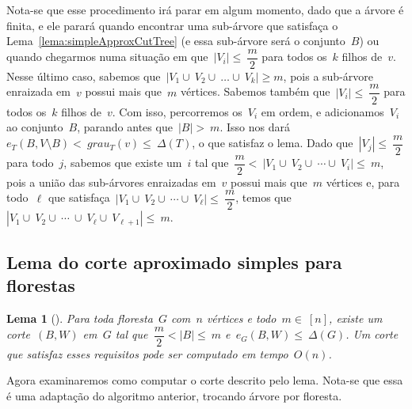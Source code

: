 \documentclass[a4paper,12pt]{article}
\newtheorem{lem}{Lema}
\begin{document}
	Nota-se que esse procedimento irá parar em algum momento, dado 
	que a árvore é finita, e ele parará quando encontrar uma 
	sub-árvore que satisfaça o Lema~\ref{lema:simpleApproxCutTree}
	(e essa sub-árvore será o conjunto~$B$) 
	ou quando chegarmos numa situação em 
	que~$|V_i|\le~\dfrac{m}{2}$ para todos os~$k$ filhos de~$v$.
	Nesse último caso, sabemos 
	que~$|V_1\cup~V_2\cup~\ldots \cup~V_k|\ge m$, pois
	a sub-árvore enraizada em~$v$ possui mais que~$m$ vértices. 
	Sabemos também que~$|V_i|\le~\dfrac{m}{2}$ para todos os~$k$ 
	filhos de~$v$. 
	Com isso, percorremos os~$V_i$ em ordem, e 
	adicionamos~$V_i$ ao conjunto~$B$, parando antes 
	que~$|B| >~m$. 
	Isso nos dará~$e_T(B,V\setminus B) <~grau_T(v)\le~\Delta(T)$, 
	o que satisfaz o lema.
	Dado que~$|V_j|\le~\dfrac{m}{2}$ para todo~$j$, sabemos que 
	existe um~$i$ tal 
	que~$\dfrac{m}{2} <~|V_1\cup~V_2 \cup~\cdots \cup~V_i| \le~m$, 
	pois a união das sub-árvores enraizadas em~$v$ possui mais 
	que~$m$ vértices e, para todo~$\ell$ que 
	satisfaça~$|V_1\cup~V_2\cup~\cdots\cup~V_\ell|\le~
	\dfrac{m}{2}$, temos 
	que~$|V_1\cup~V_2\cup~\cdots~\cup~V_\ell\cup~V_{\ell+1}|\le~m$.


\bigskip
\bigskip
\bigskip


\subsection{Lema do corte aproximado simples para florestas}

\begin{lem}[{\cite[Lemma 2]{Schmidt15}}]
\label{lema:simpleApproxCutForest}
	Para toda floresta~$G$ com~$n$ vértices e todo~$m \in~[n]$,
	existe um corte~$(B,W)$ em~$G$ tal 
	que~$\dfrac{m}{2} <|B| \le~m$ e~$e_G(B,W) \le~\Delta(G)$.
	Um corte que satisfaz esses requisitos pode ser computado em
	tempo~$O(n)$.
\end{lem}

\bigskip

Agora examinaremos como computar o corte descrito pelo lema.
Nota-se que essa é uma adaptação do algoritmo anterior, 
trocando árvore por floresta.

\medskip
\medskip
\end{document}
